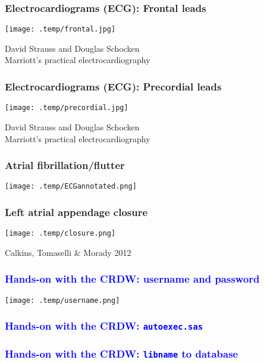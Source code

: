 \documentclass[11pt,pdftex,dvipsnames,usenames]{beamer}
\begin{document}
\begin{frame}\frametitle{Electrocardiograms (ECG): Frontal leads}
\begin{center}
\texttt{[image: .temp/frontal.jpg]}
\end{center}
David Strauss and Douglas Schocken\\ 
Marriott’s practical electrocardiography 
\end{frame}

\begin{frame}\frametitle{Electrocardiograms (ECG): Precordial leads}
\begin{center}
\texttt{[image: .temp/precordial.jpg]}
\end{center}
David Strauss and Douglas Schocken\\ 
Marriott’s practical electrocardiography
\end{frame}

\begin{frame}\frametitle{Atrial fibrillation/flutter}
\texttt{[image: .temp/ECGannotated.png]}
\end{frame}

\begin{frame}\frametitle{Left atrial appendage closure}
\begin{center}
\texttt{[image: .temp/closure.png]}
\end{center}
Calkins, Tomaselli \& Morady 2012
\end{frame}

\begin{frame}[fragile]
\frametitle{\bf\textcolor{blue}{Hands-on with the CRDW: username and password}}
\begin{center}
\texttt{[image: .temp/username.png]}
\end{center}
\end{frame}


\begin{frame}[fragile]
\frametitle{\bf\textcolor{blue}{Hands-on with the CRDW: \texttt{autoexec.sas}}}

\end{frame}

\begin{frame}[fragile]
\frametitle{\bf\textcolor{blue}{Hands-on with the CRDW: \texttt{libname} to database}}

\end{frame}
\end{document}
